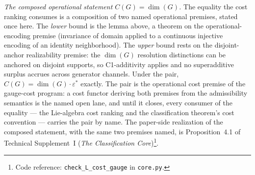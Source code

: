\documentclass[11pt]{article}
\theoremstyle{definition}
\newcommand{\coderef}[2]{\footnote{Code reference: \texttt{#1} in \texttt{#2}.}}
\newcommand{\TSI}{Technical Supplement~I (\emph{The Classification Core})}
\begin{document}
\smallskip\noindent\textit{The composed operational statement
$C(G) = \dim(G)$.}\quad
The equality the cost ranking consumes is a composition of two named
operational premises, stated once here.  The \emph{lower} bound is the
lemma above, a theorem on the operational-encoding premise (invariance
of domain applied to a continuous injective encoding of an identity
neighborhood).  The \emph{upper} bound rests on the disjoint-anchor
realizability premise: the $\dim(G)$ resolution distinctions can be
anchored on disjoint supports, so C1-additivity applies and no
superadditive surplus accrues across generator channels.  Under the
pair, $C(G) = \dim(G)\cdot\varepsilon^*$ exactly.  The pair is the
operational cost premise of the gauge-cost program: a cost functor
deriving both premises from the admissibility semantics is the named
open lane, and until it closes, every consumer of the equality --- the
Lie-algebra cost ranking and the classification theorem's cost
convention --- carries the pair by name.  The paper-side realization of
the composed statement, with the same two premises named, is
Proposition~4.1 of \TSI{}\coderef{check\_L\_cost\_gauge}{core.py}.
\end{document}
